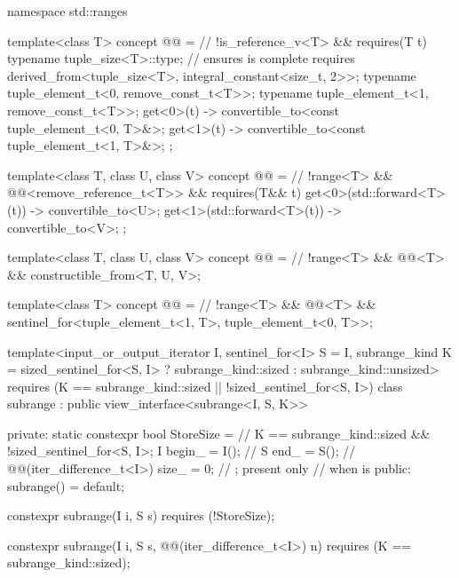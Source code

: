%
\begin{codeblock}
namespace std::ranges {
  template<class T>
    concept @@ =                                    // \expos
      !is_reference_v<T> && requires(T t) {
        typename tuple_size<T>::type;   // ensures  is complete
        requires derived_from<tuple_size<T>, integral_constant<size_t, 2>>;
        typename tuple_element_t<0, remove_const_t<T>>;
        typename tuple_element_t<1, remove_const_t<T>>;
        { get<0>(t) } -> convertible_to<const tuple_element_t<0, T>&>;
        { get<1>(t) } -> convertible_to<const tuple_element_t<1, T>&>;
      };

  template<class T, class U, class V>
    concept @@ =                     // \expos
      !range<T> && @@<remove_reference_t<T>> &&
      requires(T&& t) {
        { get<0>(std::forward<T>(t)) } -> convertible_to<U>;
        { get<1>(std::forward<T>(t)) } -> convertible_to<V>;
      };

  template<class T, class U, class V>
    concept @@ =                   // \expos
      !range<T> && @@<T> && constructible_from<T, U, V>;

  template<class T>
    concept @@ =                       // \expos
      !range<T> && @@<T> &&
      sentinel_for<tuple_element_t<1, T>, tuple_element_t<0, T>>;

  template<input_or_output_iterator I, sentinel_for<I> S = I, subrange_kind K =
      sized_sentinel_for<S, I> ? subrange_kind::sized : subrange_kind::unsized>
    requires (K == subrange_kind::sized || !sized_sentinel_for<S, I>)
  class subrange : public view_interface<subrange<I, S, K>> {
  private:
    static constexpr bool StoreSize =                      // \expos
      K == subrange_kind::sized && !sized_sentinel_for<S, I>;
    I begin_ = I();                                        // \expos
    S end_ = S();                                          // \expos
    @@(iter_difference_t<I>) size_ = 0;  // \expos; present only
                                                           // when  is 
  public:
    subrange() = default;

    constexpr subrange(I i, S s) requires (!StoreSize);

    constexpr subrange(I i, S s, @@(iter_difference_t<I>) n)
      requires (K == subrange_kind::sized);

}}
\end{codeblock}
